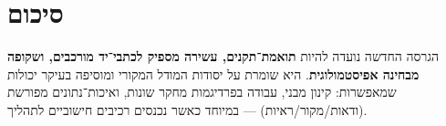 \documentclass[12pt,a4paper]{article}
\begin{document}
\section{סיכום}
הגרסה החדשה נועדה להיות \textbf{תואמת־תקנים, עשירה מספיק לכתבי־יד מורכבים, ושקופה מבחינה אפיסטמולוגית}. היא שומרת על יסודות המודל המקורי ומוסיפה בעיקר יכולות שמאפשרות: קינון מבני, עבודה בפרדיגמות מחקר שונות, ואיכות־נתונים מפורשת (ודאות/מקור/ראיות) — במיוחד כאשר נכנסים רכיבים חישוביים לתהליך.
\end{document}
